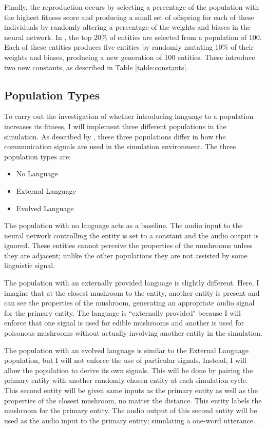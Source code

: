 \documentclass[12pt,a4paper,twoside,openright]{report}
\begin{document}
Finally, the reproduction occurs by selecting a percentage of the population with the highest fitness score and producing a small set of offspring for each of these individuals by randomly altering a percentage of the weights and biases in the neural network. In \cite{Cangelosi1998}, the top $20\%$ of entities are selected from a population of 100. Each of these entities produces five entities by randomly mutating $10\%$ of their weights and biases, producing a new generation of 100 entities. These introduce two new constants, as described in Table \ref{table:constants}.

\subsection{Population Types}\label{section:populations}

To carry out the investigation of whether introducing language to a population increases its fitness, I will implement three different populations in the simulation. As described by \cite{Cangelosi1998}, these three populations differ in how the communication signals are used in the simulation environment. The three population types are:

\begin{itemize}
	\item No Language
	\item External Language
	\item Evolved Language
\end{itemize}

The population with no language acts as a baseline. The audio input to the neural network controlling the entity is set to a constant and the audio output is ignored. These entities cannot perceive the properties of the mushrooms unless they are adjacent; unlike the other populations they are not assisted by some linguistic signal.

The population with an externally provided language is slightly different. Here, I imagine that at the closest mushroom to the entity, another entity is present and can see the properties of the mushroom, generating an appropriate audio signal for the primary entity. The language is ``externally provided" because I will enforce that one signal is used for edible mushrooms and another is used for poisonous mushrooms without actually involving another entity in the simulation. 

The population with an evolved language is similar to the External Language population, but I will not enforce the use of particular signals. Instead, I will allow the population to derive its own signals. This will be done by pairing the primary entity with another randomly chosen entity at each simulation cycle. This second entity will be given same inputs as the primary entity as well as the properties of the closest mushroom, no matter the distance. This entity labels the mushroom for the primary entity. The audio output of this second entity will be used as the audio input to the primary entity; simulating a one-word utterance.
\end{document}
